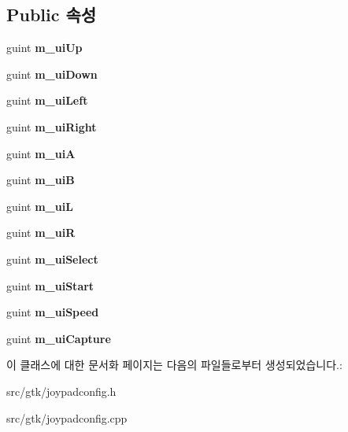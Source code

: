 \subsection*{Public 속성}
\begin{DoxyCompactItemize}
\item 
\mbox{\label{class_v_b_a_1_1_joypad_config_a9cd889f0d74de1737b32e81b21a0f78d}} 
guint {\bfseries m\+\_\+ui\+Up}
\item 
\mbox{\label{class_v_b_a_1_1_joypad_config_a9c414798f77a069295c251e9d8805452}} 
guint {\bfseries m\+\_\+ui\+Down}
\item 
\mbox{\label{class_v_b_a_1_1_joypad_config_af93165db21cb58f3b6df8f315d2471b5}} 
guint {\bfseries m\+\_\+ui\+Left}
\item 
\mbox{\label{class_v_b_a_1_1_joypad_config_abc942773203f5ece2be3e4cb177d543f}} 
guint {\bfseries m\+\_\+ui\+Right}
\item 
\mbox{\label{class_v_b_a_1_1_joypad_config_afd5a199c5dccb3d838f181a620b1fd33}} 
guint {\bfseries m\+\_\+uiA}
\item 
\mbox{\label{class_v_b_a_1_1_joypad_config_a08925fb801c679365dc7209cd68f9039}} 
guint {\bfseries m\+\_\+uiB}
\item 
\mbox{\label{class_v_b_a_1_1_joypad_config_a381cc261054c37379e3e558af75f2ade}} 
guint {\bfseries m\+\_\+uiL}
\item 
\mbox{\label{class_v_b_a_1_1_joypad_config_ae78aa1e4661abe1501ae6d1dbc55db25}} 
guint {\bfseries m\+\_\+uiR}
\item 
\mbox{\label{class_v_b_a_1_1_joypad_config_aed4863e16a6c6690449c953190954cd4}} 
guint {\bfseries m\+\_\+ui\+Select}
\item 
\mbox{\label{class_v_b_a_1_1_joypad_config_a67e697cb5ca51bc15837385ea6fdf2b3}} 
guint {\bfseries m\+\_\+ui\+Start}
\item 
\mbox{\label{class_v_b_a_1_1_joypad_config_acb2ec2357b18f2e259097b8827f37e3e}} 
guint {\bfseries m\+\_\+ui\+Speed}
\item 
\mbox{\label{class_v_b_a_1_1_joypad_config_a2322b0a1550314bab86db0231d260459}} 
guint {\bfseries m\+\_\+ui\+Capture}
\end{DoxyCompactItemize}


이 클래스에 대한 문서화 페이지는 다음의 파일들로부터 생성되었습니다.\+:\begin{DoxyCompactItemize}
\item 
src/gtk/joypadconfig.\+h\item 
src/gtk/joypadconfig.\+cpp\end{DoxyCompactItemize}
